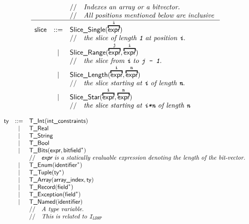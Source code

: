 \documentclass{book}
\begin{document}
\[
\begin{array}{rcl}
&&\ASTComment{Indexes an array or a bitvector.}\\
&&\ASTComment{All positions mentioned below are inclusive}\\
\hline
\slice &::=& \SliceSingle(\overname{\expr}{\vi}) \\
  & & \ASTComment{the slice of length \texttt{1} at position \vi.}\\
  &|& \SliceRange(\overname{\expr}{\vj}, \overname{\expr}{\vi}) \\
  & & \ASTComment{the slice from \vi\ to \texttt{j - 1}.}\\
  &|& \SliceLength(\overname{\expr}{\vi}, \overname{\expr}{\vn}) \\
  & & \ASTComment{the slice starting at \vi\ of length \vn.}\\
  &|& \SliceStar(\overname{\expr}{\vi}, \overname{\expr}{\vn}) \\
  & & \ASTComment{the slice starting at \texttt{i*n} of length \vn}
\end{array}
\]

\[
\begin{array}{rcl}
\ty &::=& \TInt(\intconstraints) \\
  &|& \TReal \\
  &|& \TString \\
  &|& \TBool \\
  &|& \TBits(\expr, \bitfield^{*}) \\
  & & \ASTComment{\expr\ is a statically evaluable expression denoting the length of the bit-vector.}\\
  &|& \TEnum(\identifier^{*}) \\
  &|& \TTuple(\ty^{*}) \\
  &|& \TArray(\arrayindex, \ty) \\
  &|& \TRecord(\Field^{*}) \\
  &|& \TException(\Field^{*}) \\
  &|& \TNamed(\identifier)\\
  & & \ASTComment{A type variable.}\\
  & & \ASTComment{This is related to \identi{LDNP}}
\end{array}
\]
\end{document}
